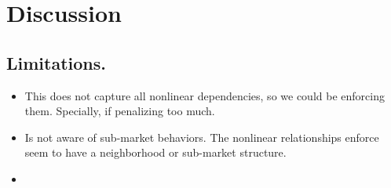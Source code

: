 \documentclass[12pt, draft]{article}
\theoremstyle{plain}
\theoremstyle{definition}
\newcommand{\1}{\mathbf{1}}
\begin{document}
{%







\section{Discussion}



\subsection{Limitations.}


\begin{itemize}
    \item  This does not capture all nonlinear dependencies, so we could be enforcing them. Specially, if penalizing too much.
    \item Is not aware of sub-market behaviors. The nonlinear relationships enforce seem to have a neighborhood or sub-market structure.
    \item 
    

\end{itemize}}
\end{document}
